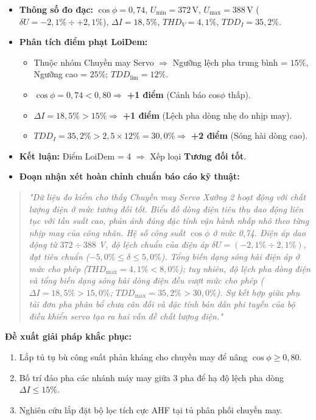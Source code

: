 \documentclass[12pt,a4paper]{article}
\begin{document}
\begin{itemize}
  \item \textbf{Thông số đo đạc:} $\cos\phi = 0{,}74$, $U_{\min} = 372\,\mathrm{V}$, $U_{\max} = 388\,\mathrm{V}$ ($\delta U = -2{,}1\% \div +2{,}1\%$), $\Delta I = 18{,}5\%$, $THD_V = 4{,}1\%$, $TDD_I = 35{,}2\%$.
  \item \textbf{Phân tích điểm phạt LoiDem:}
  \begin{itemize}
    \item Thuộc nhóm Chuyền may Servo $\Rightarrow$ Ngưỡng lệch pha trung bình = $15\%$, Ngưỡng cao = $25\%$; $TDD_{\mathrm{lim}} = 12\%$.
    \item $\cos\phi = 0{,}74 < 0{,}80 \Rightarrow$ \textbf{+1 điểm} (Cảnh báo cos$\phi$ thấp).
    \item $\Delta I = 18{,}5\% > 15\% \Rightarrow$ \textbf{+1 điểm} (Lệch pha dòng nhẹ do nhịp may).
    \item $TDD_I = 35{,}2\% > 2{,}5 \times 12\% = 30{,}0\% \Rightarrow$ \textbf{+2 điểm} (Sóng hài dòng cao).
  \end{itemize}
  \item \textbf{Kết luận:} Điểm LoiDem = 4 $\Rightarrow$ Xếp loại \textbf{\color{warningyellow}Tương đối tốt}.
  \item \textbf{Đoạn nhận xét hoàn chỉnh chuẩn báo cáo kỹ thuật:}
\end{itemize}

\begin{quote}\itshape
"Dữ liệu đo kiểm cho thấy Chuyền may Servo Xưởng 2 hoạt động với chất lượng điện ở mức tương đối tốt. Biểu đồ dòng điện tiêu thụ dao động liên tục với tần suất cao, phản ánh đúng đặc tính vận hành nhấp nhô theo từng nhịp may của công nhân. Hệ số công suất $\cos\phi$ ở mức 0,74. Điện áp dao động từ $372 \div 388$ V, độ lệch chuẩn của điện áp $\delta U = (-2{,}1\% \div 2{,}1\%)$, đạt tiêu chuẩn ($-5{,}0\% \le \delta \le 5{,}0\%$). Tổng biến dạng sóng hài điện áp ở mức cho phép ($THD_{\max} = 4{,}1\% < 8{,}0\%$); tuy nhiên, độ lệch pha dòng điện và tổng biến dạng sóng hài dòng điện đều vượt mức cho phép ($\Delta I = 18{,}5\% > 15{,}0\%$; $TDD_{\max} = 35{,}2\% > 30{,}0\%$). Sự kết hợp giữa phụ tải đơn pha phân bổ chưa cân đối và đặc tính bán dẫn phi tuyến của bộ điều khiển servo tạo ra hai vấn đề chất lượng điện."
\end{quote}

\textbf{Đề xuất giải pháp khắc phục:}
\begin{enumerate}
  \item Lắp tủ tụ bù công suất phản kháng cho chuyền may để nâng $\cos\phi \ge 0{,}80$.
  \item Bố trí đảo pha các nhánh máy may giữa 3 pha để hạ độ lệch pha dòng $\Delta I \le 15\%$.
  \item Nghiên cứu lắp đặt bộ lọc tích cực AHF tại tủ phân phối chuyền may.
\end{enumerate}
\end{document}
